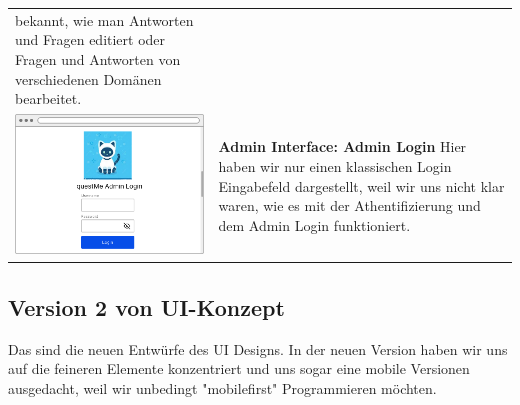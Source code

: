 \begin{tabular}{C{6cm}  L{7cm}}
    bekannt, wie man Antworten und Fragen editiert oder Fragen und Antworten von verschiedenen Domänen bearbeitet.                         \\
    \includegraphics[width=\linewidth]{bilder/old vers. UI Design/Admin Interface.png}    & \textbf{Admin Interface: Admin Login} \newline
    Hier haben wir nur einen klassischen Login Eingabefeld dargestellt, weil wir uns nicht klar waren, wie es mit der Athentifizierung und dem Admin
    Login funktioniert.
\end{tabular}

\newpage

\subsection{Version 2 von UI-Konzept}

Das sind die neuen Entwürfe des UI Designs. In der neuen Version haben wir uns auf die
feineren Elemente konzentriert und uns sogar eine mobile Versionen ausgedacht, weil wir
unbedingt "mobilefirst" Programmieren möchten.
\\

